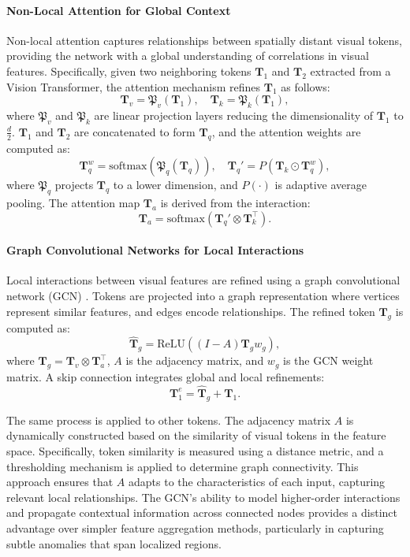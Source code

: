\paragraph*{Non-Local Attention for Global Context}
Non-local attention \cite{wang2018non} captures relationships between spatially distant visual tokens, providing the network with a global understanding of correlations in visual features. Specifically, given two neighboring tokens $\mathbf{T}_1$ and $\mathbf{T}_2$ extracted from a Vision Transformer, the attention mechanism refines $\mathbf{T}_1$ as follows:
\[
\mathbf{T}_v = \mathfrak{P}_v(\mathbf{T}_1), \quad \mathbf{T}_k = \mathfrak{P}_k(\mathbf{T}_1),
\]
where $\mathfrak{P}_v$ and $\mathfrak{P}_k$ are linear projection layers reducing the dimensionality of $\mathbf{T}_1$ to $\frac{d}{2}$. $\mathbf{T}_1$ and $\mathbf{T}_2$ are concatenated to form $\mathbf{T}_q$, and the attention weights are computed as:
\[
\mathbf{T}_q^w = \text{softmax}(\mathfrak{P}_q(\mathbf{T}_q)), \quad \mathbf{T}_q' = P\left(\mathbf{T}_k \odot \mathbf{T}_q^w\right),
\]
where $\mathfrak{P}_q$ projects $\mathbf{T}_q$ to a lower dimension, and $P(\cdot)$ is adaptive average pooling. The attention map $\mathbf{T}_a$ is derived from the interaction:
\[
\mathbf{T}_a = \text{softmax}(\mathbf{T}_q' \otimes \mathbf{T}_k^\top).
\]

\paragraph*{Graph Convolutional Networks for Local Interactions}
Local interactions between visual features are refined using a graph convolutional network (GCN) \cite{te2020edge}. Tokens are projected into a graph representation where vertices represent similar features, and edges encode relationships. The refined token $\hat{\mathbf{T}}_g$ is computed as:
\[
\hat{\mathbf{T}}_g = \text{ReLU}\left((I - A)\mathbf{T}_g w_g\right),
\]
where $\mathbf{T}_g = \mathbf{T}_v \otimes \mathbf{T}_a^\top$, $A$ is the adjacency matrix, and $w_g$ is the GCN weight matrix. A skip connection integrates global and local refinements:
\[
\mathbf{T}_1^e = \hat{\mathbf{T}}_g + \mathbf{T}_1.
\]

\noindent The same process is applied to other tokens. The adjacency matrix $A$ is dynamically constructed based on the similarity of visual tokens in the feature space. Specifically, token similarity is measured using a distance metric, and a thresholding mechanism is applied to determine graph connectivity. This approach ensures that $A$ adapts to the characteristics of each input, capturing relevant local relationships. The GCN's ability to model higher-order interactions and propagate contextual information across connected nodes provides a distinct advantage over simpler feature aggregation methods, particularly in capturing subtle anomalies that span localized regions.


